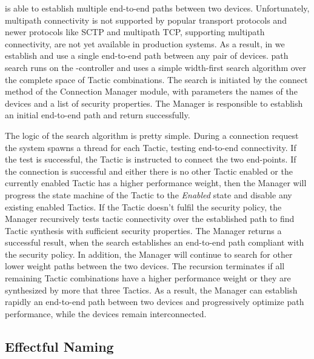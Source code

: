 \signpost is able to establish multiple end-to-end paths between two devices.
Unfortunately, multipath connectivity is not supported by popular transport
protocols and newer protocols like SCTP and multipath TCP, supporting multipath
connectivity, are not yet available in production systems.  As a result,  in
\signpost we establish and use a single end-to-end path between any pair of
devices.  \signpost path search runs on the \signpost-controller and uses a
simple width-first search algorithm over the complete space of  Tactic
combinations. The search is initiated by the connect method of the Connection
Manager module, with parameters the names of the devices and a list of security
properties. The Manager is responsible to establish an initial end-to-end path and
return successfully. 

The logic of the search algorithm is pretty simple. During a connection request
the system spawns a thread for each Tactic, testing end-to-end connectivity.  If
the test is successful, the Tactic is instructed to connect the two end-points.
If the connection is successful and either there is no other Tactic enabled or
the currently enabled Tactic has a higher performance weight, then the Manager
will progress the state machine of the Tactic to the {\it Enabled}\/ state and
disable any existing enabled Tactics. If the Tactic doesn't fulfil the security
policy, the Manager recursively tests tactic connectivity over the established
path to find Tactic synthesis with sufficient security properties. The Manager
returns a successful result, when the search establishes an end-to-end path
compliant with the security policy.  In addition, the Manager will continue to
search for other lower weight paths between the two devices.  The recursion
terminates if all remaining Tactic combinations have a higher performance weight
or they are synthesized by more that three Tactics. As a result, the Manager can
establish rapidly an end-to-end path between two devices and progressively
optimize path performance, while the devices remain interconnected. 

\subsection{Effectful Naming} \label{signpost-naming}

